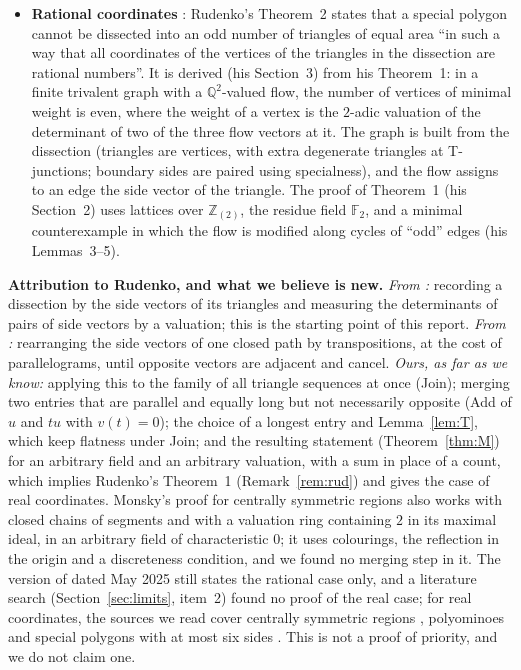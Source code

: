 \documentclass[11pt]{article}
\theoremstyle{definition}
\newcommand{\Q}{\mathbb{Q}}
\newcommand{\Z}{\mathbb{Z}}
\newcommand{\F}{\mathbb{F}}
\begin{document}
\begin{itemize}
Steps~3 and~4 of our Theorem~\ref{thm:M}.
\item \textbf{Rational coordinates} \cite{Rud}: Rudenko's Theorem~2 states that a special polygon
cannot be dissected into an odd number of triangles of equal area ``in such a way that all
coordinates of the vertices of the triangles in the dissection are rational numbers''. It is derived
(his Section~3) from his Theorem~1: in a finite trivalent graph with a $\Q^2$-valued flow, the
number of vertices of minimal weight is even, where the weight of a vertex is the $2$-adic
valuation of the determinant of two of the three flow vectors at it. The graph is built from the
dissection (triangles are vertices, with extra degenerate triangles at T-junctions; boundary sides
are paired using specialness), and the flow assigns to an edge the side vector of the triangle. The
proof of Theorem~1 (his Section~2) uses lattices over $\Z_{(2)}$, the residue field $\F_2$, and a
minimal counterexample in which the flow is modified along cycles of ``odd'' edges (his Lemmas~3--5).
\end{itemize}

\textbf{Attribution to Rudenko, and what we believe is new.} \emph{From \cite{Rud}:} recording a
dissection by the side vectors of its triangles and measuring the determinants of pairs of side
vectors by a valuation; this is the starting point of this report. \emph{From \cite{Rud12}:}
rearranging the side vectors of one closed path by transpositions, at the cost of parallelograms,
until opposite vectors are adjacent and cancel. \emph{Ours, as far as we know:} applying this to
the family of all triangle sequences at once (Join); merging two entries that are parallel and
equally long but not necessarily opposite (Add of $u$ and $tu$ with $v(t)=0$); the choice of a
longest entry and Lemma~\ref{lem:T}, which keep flatness under Join; and the resulting statement
(Theorem~\ref{thm:M}) for an arbitrary field and an arbitrary valuation, with a sum in place of a
count, which implies Rudenko's Theorem~1 (Remark~\ref{rem:rud}) and gives the case of real
coordinates. Monsky's proof for centrally symmetric regions \cite{Mon90} also works with closed
chains of segments and with a valuation ring containing $2$ in its maximal ideal, in an arbitrary
field of characteristic $0$; it uses colourings, the reflection in the origin and a discreteness
condition, and we found no merging step in it. The version of \cite{Rud}
dated May 2025 still states the rational case only, and a literature search (Section~\ref{sec:limits},
item~2) found no proof of the real case; for real coordinates, the sources we read cover
centrally symmetric regions \cite{Mon90}, polyominoes \cite{Ste99,Pra} and special polygons with
at most six sides \cite{Ste00}. This is not a proof of priority, and we do not claim one.
\end{document}
